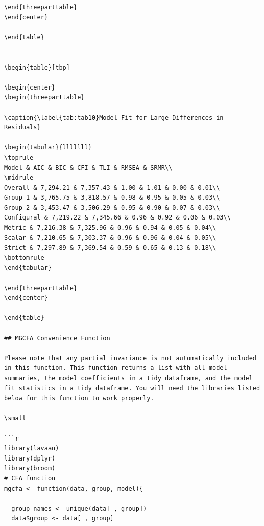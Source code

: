 \documentclass[
  man]{apa6}
\begin{document}
\begin{verbatim}
\end{threeparttable}
\end{center}

\end{table}


\begin{table}[tbp]

\begin{center}
\begin{threeparttable}

\caption{\label{tab:tab10}Model Fit for Large Differences in Residuals}

\begin{tabular}{lllllll}
\toprule
Model & AIC & BIC & CFI & TLI & RMSEA & SRMR\\
\midrule
Overall & 7,294.21 & 7,357.43 & 1.00 & 1.01 & 0.00 & 0.01\\
Group 1 & 3,765.75 & 3,818.57 & 0.98 & 0.95 & 0.05 & 0.03\\
Group 2 & 3,453.47 & 3,506.29 & 0.95 & 0.90 & 0.07 & 0.03\\
Configural & 7,219.22 & 7,345.66 & 0.96 & 0.92 & 0.06 & 0.03\\
Metric & 7,216.38 & 7,325.96 & 0.96 & 0.94 & 0.05 & 0.04\\
Scalar & 7,210.65 & 7,303.37 & 0.96 & 0.96 & 0.04 & 0.05\\
Strict & 7,297.89 & 7,369.54 & 0.59 & 0.65 & 0.13 & 0.18\\
\bottomrule
\end{tabular}

\end{threeparttable}
\end{center}

\end{table}

## MGCFA Convenience Function

Please note that any partial invariance is not automatically included in this function. This function returns a list with all model summaries, the model coefficients in a tidy dataframe, and the model fit statistics in a tidy dataframe. You will need the libraries listed below for this function to work properly.

\small

```r
library(lavaan)
library(dplyr)
library(broom)
# CFA function
mgcfa <- function(data, group, model){
  
  group_names <- unique(data[ , group])
  data$group <- data[ , group]
  

\end{verbatim}
\end{document}
